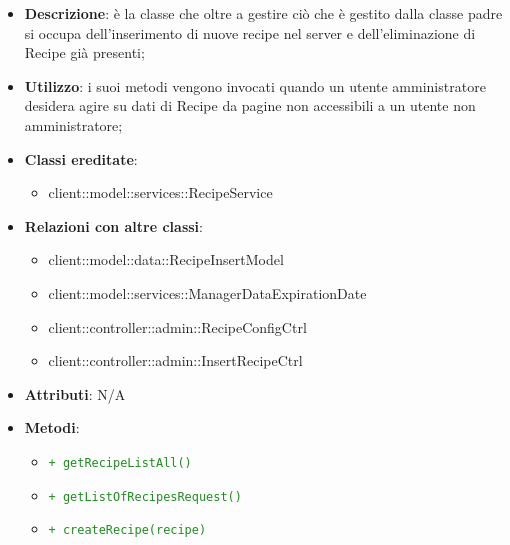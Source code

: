 			\begin{itemize}
				\item \textbf{Descrizione}: è la classe che oltre a gestire ciò che è gestito dalla classe padre si occupa dell'inserimento di nuove recipe nel server e dell'eliminazione di Recipe già presenti;
				\item \textbf{Utilizzo}: i suoi metodi vengono invocati quando un utente amministratore desidera agire su dati di Recipe da pagine non accessibili a un utente non amministratore;
				\item \textbf{Classi ereditate}:
					\begin{itemize}
						\item client::model::services::RecipeService
					\end{itemize}
				\item \textbf{Relazioni con altre classi}:
					\begin{itemize}
						\item client::model::data::RecipeInsertModel
						\item client::model::services::ManagerDataExpirationDate
						\item client::controller::admin::RecipeConfigCtrl
						\item client::controller::admin::InsertRecipeCtrl
					\end{itemize}
				\item \textbf{Attributi}: N/A
				\item \textbf{Metodi}:
				\begin{itemize}
					\item \textcolor{forestgreen}{\texttt{+ getRecipeListAll()}}
					\item \textcolor{forestgreen}{\texttt{+ getListOfRecipesRequest()}}
					\item \textcolor{forestgreen}{\texttt{+ createRecipe(recipe)}}
\end{itemize}
\end{itemize}
